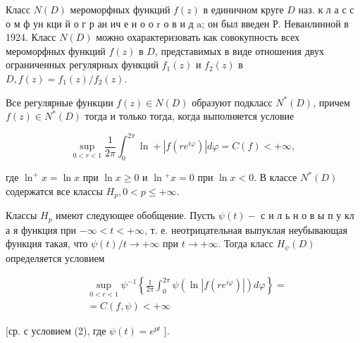 \documentclass[10pt]{article}
\begin{document}
Класс $N(D)$ мероморфных функций $f(z)$ в единичном круге $D$ наз. к л а с с о м ф ун кци й о г р ан ич е н о о r о в и д $\mathrm{a}$; он был введен Р. Неванлинной в 1924. Класс $N(D)$ можно охарактеризовать как совокупность всех мероморфных функций $f(z)$ в $D$, представимых в виде отношения двух ограниченных регулярных функций $f_{1}(z)$ и $f_{2}(z)$ в $D, f(z)=f_{1}(z) / f_{2}(z)$.



Все регулярные функции $f(z) \in N(D)$ образуют подкласс $N^{*}(D)$, причем $f(z) \in N^{*}(D)$ тогда и только тогда, когда выполняется условие



\[

\sup _{0<r<1} \frac{1}{2 \pi} \int_{0}^{2 \pi} \ln +\left|f\left(r e^{i \varphi}\right)\right| d \varphi=C(f)<+\infty,

\]



где $\ln ^{+} x=\ln x$ при $\ln x \geqslant 0$ и $\ln { }^{+} x=0$ при $\ln x<0$. В классе $N^{*}(D)$ содержатся все классы $H_{p}, 0<p \leqslant+\infty$.



Классы $H_{p}$ имеют следующее обобщение. Пусть $\psi(t)-$ с и л ь н о в ы п у кл а я функция при $-\infty<t<+\infty$, т. е. неотрицательная выпуклая неубывающая функция такая, что $\psi(t) / t \rightarrow+\infty$ при $t \rightarrow+\infty$. Тогда класс $H_{\psi}(D)$ определяется условием



\[

\begin{aligned}

& \sup _{0<r<1} \psi^{-1}\left\{\frac{1}{2 \pi} \int_{0}^{2 \pi} \psi\left(\ln \left|f\left(r e^{i \varphi}\right)\right|\right) d \varphi\right\}= \\

& =C(f, \psi)<+\infty

\end{aligned}

\]



[ср. с условием (2), где $\psi(t)=e^{p t}$ ].
\end{document}
